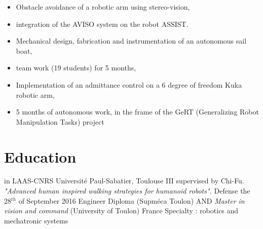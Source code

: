 \documentclass[11pt,a4paper]{moderncv}
\newcommand{\items}{\item[*] \hspace{2mm}}
\begin{document}
%
{
\begin{itemize}%
\items Obstacle avoidance of a robotic arm using stereo-vision,
\items integration of the AVISO system on the robot ASSIST.
\newline{}
\end{itemize}
}
%
%
{
\begin{itemize}%
\items Mechanical design, fabrication and instrumentation of an autonomous sail boat,
\items team work (19 students) for 5 months,
\newline{}
\end{itemize}
}
%
%
%
{
\begin{itemize}%
\items Implementation of an admittance control on a 6 degree of freedom Kuka robotic arm,
\items 5 months of autonomous work, in the frame of the GeRT (Generalizing Robot Manipulation Tasks) project
\newline{}
\end{itemize}
}

\newpage

\section{Education}
{in LAAS-CNRS}
{Universit\'e Paul-Sabatier, Toulouse III}
{supervised by Chi-Fu. \textit{"Advanced human inspired walking strategies for humanoid robots".} Defense the 28$^{th}$ of September 2016}
{}
{Engineer Diploma (Supm\'eca Toulon) AND \emph{Master in vision and command} (University of Toulon)}
{France}
{}
{Specialty : robotics and mechatronic systems}
%
%
%
%
{}{}{}
%
\end{document}
